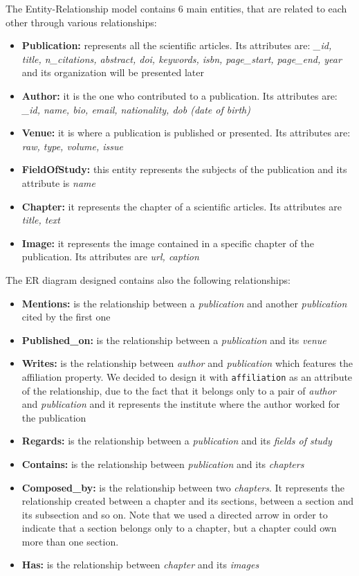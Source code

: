 \documentclass{Configuration_Files/PoliMi3i_thesis}
\begin{document}
The Entity-Relationship model contains 6 main entities, that are related to each other through various relationships:
\begin{itemize}
	\item \textbf{Publication:} represents all the scientific articles. Its attributes are: \emph{\_id, title, n\_citations,
		abstract, doi, keywords, isbn, page\_start, page\_end, year} and its organization will be presented later
	\item \textbf{Author:} it is the one who contributed to a publication. Its attributes are: \emph{\_id, name, bio,
		email, nationality, dob (date of birth)}
	\item \textbf{Venue:} it is where a publication is published or presented. Its attributes are: \emph{raw, type,
		volume, issue}
	\item \textbf{FieldOfStudy:} this entity represents the subjects of the publication and its attribute is \emph{name}
	\item \textbf{Chapter:} it represents the chapter of a scientific articles. Its attributes are \emph{title, text}
	\item \textbf{Image:} it represents the image contained in a specific chapter of the publication. Its attributes are
		\emph{url, caption}
\end{itemize}

The ER diagram designed contains also the following relationships:
\begin{itemize}
	\item \textbf{Mentions:} is the relationship between a \emph{publication} and another \emph{publication} cited by the first one
	\item \textbf{Published\_on:} is the relationship between a \emph{publication} and its \emph{venue}
	\item \textbf{Writes:} is the relationship between \emph{author} and \emph{publication} which features the affiliation property.
		We decided to design it with \verb |affiliation| as an attribute of the relationship, due to the fact that it belongs
		only to a pair of \emph{author} and \emph{publication} and it represents the institute where the author worked for the publication
	\item \textbf{Regards:} is the relationship between a \emph{publication} and its \emph{fields of study}
	\item \textbf{Contains:} is the relationship between \emph{publication} and its \emph{chapters} 
	\item \textbf{Composed\_by:} is the relationship between two \emph{chapters}. It represents the relationship created
		between a chapter and its sections, between a section and its subsection and so on. Note that we used a directed
		arrow in order to indicate that a section belongs only to a chapter, but a chapter could own more than one section.
	\item \textbf{Has:} is the relationship between \emph{chapter} and its \emph{images}
\end{itemize}
\end{document}
